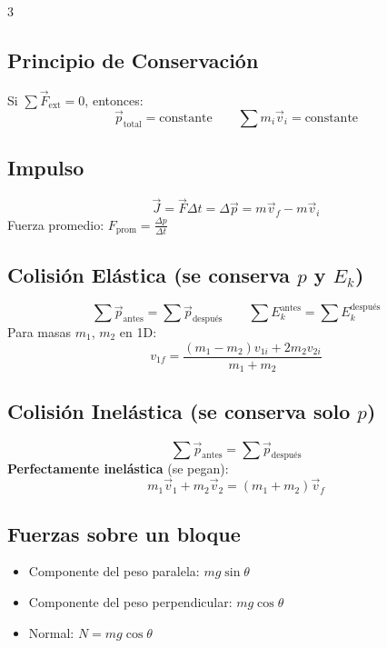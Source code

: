\documentclass[10pt,landscape]{article}
\begin{document}
\begin{multicols}{3}
\subsection*{Principio de Conservaci\'{o}n}
Si $\sum \vec{F}_{\text{ext}} = 0$, entonces:
\[
\boxed{\vec{p}_{\text{total}} = \text{constante}} \qquad \sum m_i \vec{v}_i = \text{constante}
\]

\subsection*{Impulso}
\[
\boxed{\vec{J} = \vec{F}\Delta t = \Delta \vec{p} = m\vec{v}_f - m\vec{v}_i}
\]
Fuerza promedio: $\displaystyle F_{\text{prom}} = \frac{\Delta p}{\Delta t}$

\vspace{4pt}

\subsection*{Colisi\'{o}n El\'{a}stica (se conserva $p$ y $E_k$)}
\[
\sum \vec{p}_{\text{antes}} = \sum \vec{p}_{\text{despu\'{e}s}} \qquad \sum E_k^{\text{antes}} = \sum E_k^{\text{despu\'{e}s}}
\]
Para masas $m_1$, $m_2$ en 1D:
\[
v_{1f} = \frac{(m_1-m_2)v_{1i} + 2m_2 v_{2i}}{m_1+m_2}
\]

\subsection*{Colisi\'{o}n Inel\'{a}stica (se conserva solo $p$)}
\[
\sum \vec{p}_{\text{antes}} = \sum \vec{p}_{\text{despu\'{e}s}}
\]
\textbf{Perfectamente inel\'{a}stica} (se pegan):
\[
\boxed{m_1\vec{v}_1 + m_2\vec{v}_2 = (m_1+m_2)\vec{v}_f}
\]

\vspace{4pt}

\subsection*{Fuerzas sobre un bloque}
\begin{itemize}[leftmargin=*,nosep,topsep=0pt]
  \item Componente del peso paralela: $mg\sin\theta$
  \item Componente del peso perpendicular: $mg\cos\theta$
  \item Normal: $N = mg\cos\theta$
\end{itemize}


\end{multicols}
\end{document}
